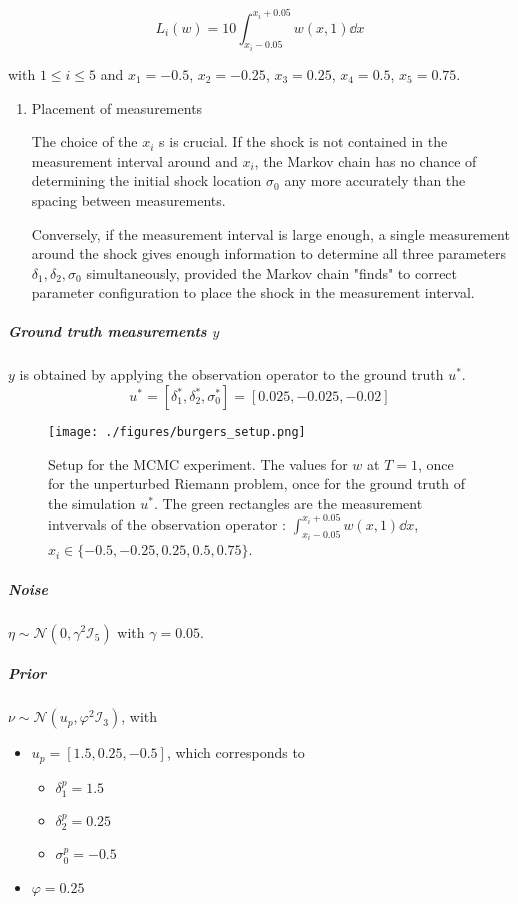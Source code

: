 \documentclass[11pt]{article}
\newcommand{\I}{{\mathcal{I}}}
\newcommand{\N}[2]{\mathcal{N}\left(#1,#2\right)}
\begin{document}
\begin{equation}
L_i(w) = 10 \int_{x_i - 0.05}^{x_i + 0.05} w(x, 1) \dd x
\end{equation}

with \(1 \leq i \leq 5\) and \(x_1 = -0.5\), \(x_2= -0.25\), \(x_3 = 0.25\), \(x_4 = 0.5\), \(x_5 = 0.75\).

\begin{enumerate}
\item Placement of measurements
\label{sec:org637d9d0}

The choice of the \(x_i\) s is crucial. If the shock is not contained in the measurement
interval around and \(x_i\), the Markov chain has no chance of determining the initial
shock location \(\sigma_0\) any more accurately than the spacing between measurements.

Conversely, if the measurement interval is large enough, a single measurement around the
shock gives enough information to determine all three parameters \(\delta_1, \delta_2, \sigma_0\)
simultaneously, provided the Markov chain "finds" to correct parameter configuration to place the
shock in the measurement interval.
\end{enumerate}

\subparagraph{Ground truth measurements \(y\)}
\label{sec:orga3f1a3c}

\(y\) is obtained by applying the observation operator to the ground truth \(u^*\).
$$u^* = [\delta_1^*, \delta_2^*, \sigma_0^*] = [0.025, -0.025, -0.02]$$

\begin{figure}[htbp]
\centering
\texttt{[image: ./figures/burgers\_setup.png]}
\caption{\label{fig:burgers_setup}
Setup for the MCMC experiment. The values for \(w\) at \(T=1\), once for the unperturbed Riemann problem, once for the ground truth of the simulation \(u^*\). The green rectangles are the measurement intvervals of the observation operator : \(\int_{x_i - 0.05}^{x_i + 0.05} w(x,1)\dd x\), \(x_i \in \{ -0.5, -0.25, 0.25, 0.5, 0.75 \}\).}
\end{figure}

\subparagraph{Noise}
\label{sec:orge319d8b}

\(\eta \sim \N{0}{\gamma^2 \I_5}\) with \(\gamma = 0.05\).

\subparagraph{Prior}
\label{sec:org63494f7}

\(\nu \sim \N{u_p}{\varphi^2 \I_3}\), with
\begin{itemize}
\item \(u_p = [1.5, 0.25, -0.5]\),
which corresponds to
\begin{itemize}
\item \(\delta_1^p = 1.5\)
\item \(\delta_2^p = 0.25\)
\item \(\sigma_0^p = -0.5\)
\end{itemize}
\item \(\varphi = 0.25\)
\end{itemize}
\end{document}

